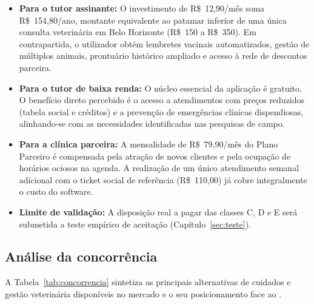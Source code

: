 \begin{itemize}
  \item \textbf{Para o tutor assinante:} O investimento de R\$~12,90/mês soma R\$~154,80/ano, montante equivalente ao patamar inferior de uma única consulta veterinária em Belo Horizonte (R\$~150 a R\$~350). Em contrapartida, o utilizador obtém lembretes vacinais automatizados, gestão de múltiplos animais, prontuário histórico ampliado e acesso à rede de descontos parceira.
  \item \textbf{Para o tutor de baixa renda:} O núcleo essencial da aplicação é gratuito. O benefício direto percebido é o acesso a atendimentos com preços reduzidos (tabela social e créditos) e a prevenção de emergências clínicas dispendiosas, alinhando-se com as necessidades identificadas nas pesquisas de campo.
  \item \textbf{Para a clínica parceira:} A mensalidade de R\$~79,90/mês do Plano Parceiro é compensada pela atração de novos clientes e pela ocupação de horários ociosos na agenda. A realização de um único atendimento semanal adicional com o ticket social de referência (R\$~110,00) já cobre integralmente o custo do software.
  \item \textbf{Limite de validação:} A disposição real a pagar das classes C, D e E será submetida a teste empírico de aceitação (Capítulo~\ref{sec:teste}).
\end{itemize}

\subsection{Análise da concorrência}

A Tabela~\ref{tab:concorrencia} sintetiza as principais alternativas de cuidados e gestão veterinária disponíveis no mercado e o seu posicionamento face ao \projeto{}.

